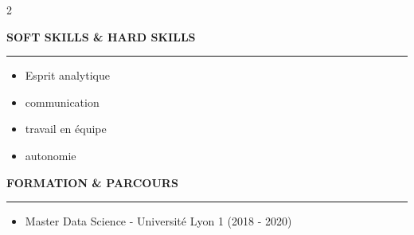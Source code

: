 \documentclass[10pt]{article}
\newlength{\SidebarPadL}
\newlength{\SidebarPadR}
\newcommand{\sidehead}[1]{%
  {\bfseries\MakeUppercase{#1}}\par\vspace{-7pt}
  \color{white}\rule{\linewidth}{0.5pt}\par\vspace{2pt}\color{white}
}
\begin{document}
\begin{paracol}{2}
\begin{adjustwidth}{\SidebarPadL}{\SidebarPadR}
\vspace{4mm}

\sidehead{Soft Skills \& Hard Skills}
\begin{itemize}
\item Esprit analytique
\item communication
\item travail en équipe
\item autonomie
\end{itemize}

\vspace{4mm}

\sidehead{Formation \& Parcours}
\begin{itemize}
\item Master Data Science - Université Lyon 1 (2018 - 2020)
\end{itemize}

\end{adjustwidth}
\end{paracol}
\end{document}
